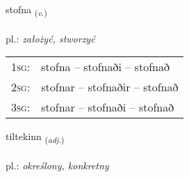 \documentclass[frontgrid, backgrid]{flacards}\usepackage[]{graphicx}\usepackage[]{xcolor}
\begin{document}
\renewcommand{\blhead}{\vskip5pt {\small\bfseries\footnotesize Sagnorð | czasownik }}
\renewcommand{\bcfoot}{\vskip5pt \hspace{2pt}{\small\bfseries\footnotesize 1K}}


{stofna \small{\textsubscript{(\textit{v.})}} \\[1ex] %
\textphonetic{[stɔpna]} \\
pl.: \emph{założyć, stworzyć} \\  [2ex]
\renewcommand*{\arraystretch}{0.8}
\begin{tabular}{p{1cm}l}
\textsc{1sg}: & stofna -- stofnaði -- stofnað \\ 
\textsc{2sg}: & stofnar -- stofnaðir -- stofnað \\ 
\textsc{3sg}: & stofnar -- stofnaði -- stofnað \\ 
\end{tabular}
}

\renewcommand{\flhead}{\vskip5pt \fboxsep=0pt {\small\bfseries\footnotesize Lýsingarorð | przymiotnik}}
\renewcommand{\fcfoot}{\vskip5pt \fboxsep=0pt \hspace{2pt}{\small\bfseries\footnotesize 1K}}

\renewcommand{\blhead}{\vskip5pt {\small\bfseries\footnotesize Lýsingarorð | przymiotnik }}
\renewcommand{\bcfoot}{\vskip5pt \hspace{2pt}{\small\bfseries\footnotesize 1K}}


{tiltekinn \small{\textsubscript{(\textit{adj.})}} \\[1ex] %
\textphonetic{[tʰɪltʰɛcɪn]} \\
pl.: \emph{określony, konkretny} \\  [2ex]
\renewcommand*{\arraystretch}{0.8}
}
\end{document}
